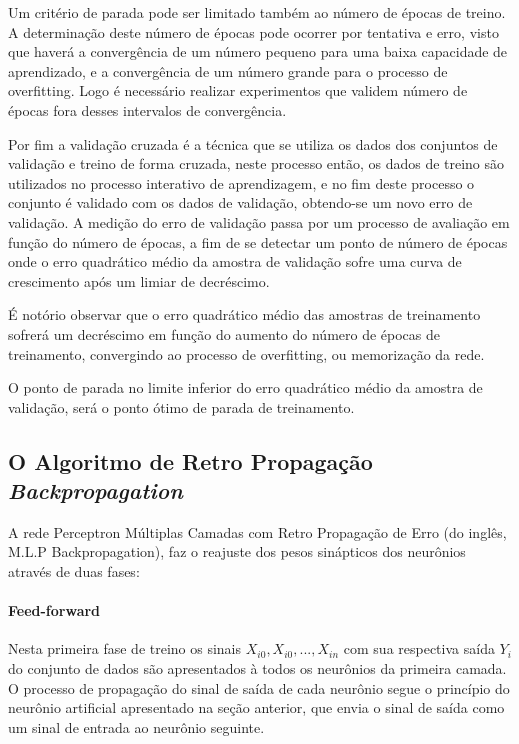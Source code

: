     Um critério de parada pode ser limitado também ao número de épocas de treino. A determinação  deste número de épocas pode ocorrer por tentativa e erro, visto que haverá a convergência de um número pequeno para uma baixa capacidade de aprendizado, e a convergência de um número grande para o processo de overfitting. Logo é necessário realizar experimentos que validem número de épocas fora desses intervalos de convergência.
    
    Por fim a validação cruzada é a técnica que se utiliza os dados dos conjuntos de validação e treino de forma cruzada, neste processo então, os dados de treino são utilizados no processo interativo de aprendizagem, e no fim deste processo o conjunto é validado com os dados de validação, obtendo-se um novo erro de validação.
    A medição do erro de validação passa por um processo de avaliação em função do número de épocas, a fim de se detectar um ponto de número de épocas onde o erro quadrático médio da amostra de validação sofre uma curva de crescimento após um limiar de decréscimo.
    
    É notório observar que o erro quadrático médio das amostras de treinamento sofrerá um decréscimo em função do aumento do número de épocas de treinamento, convergindo ao processo de overfitting, ou memorização da rede.
    
    O ponto de parada no limite inferior do erro quadrático médio da amostra de validação, será o ponto ótimo de parada de treinamento.
    
    \begin{figure}[H]
    \end{figure}

    \subsection{O Algoritmo de Retro Propagação \textit{Backpropagation}}

    A rede Perceptron Múltiplas Camadas com Retro Propagação de Erro (do inglês, M.L.P Backpropagation), faz o reajuste dos pesos sinápticos dos neurônios através de duas fases:
     \paragraph*{Feed-forward} Nesta primeira fase de treino os sinais $X_{i0},X_{i0},...,X_{in}$ com sua respectiva saída $Y_i$ do conjunto de dados são apresentados à todos os neurônios da primeira camada. O processo de propagação do sinal de saída de cada neurônio segue o princípio do neurônio artificial apresentado na seção anterior, que envia o sinal de saída como um sinal de entrada ao neurônio seguinte.
     
